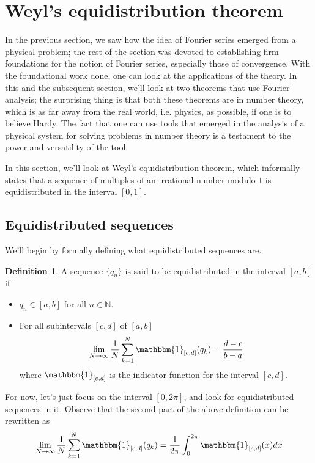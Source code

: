 \documentclass[12pt, titlepage]{article}
\theoremstyle{definition}
\newtheorem{defn}{Definition}[section]
\newcommand{\indi}[1]{\mathbbm{#1}}
\begin{document}
\section{Weyl's equidistribution theorem}
In the previous section, we saw how the idea of Fourier series emerged from a physical problem; the rest of the section was devoted to establishing firm foundations for the notion of Fourier series, especially those of convergence. With the foundational work done, one can look at the applications of the theory. In this and the subsequent section, we'll look at two theorems that use Fourier analysis; the surprising thing is that both these theorems are in number theory, which is as far away from the real world, i.e. physics, as possible, if one is to believe Hardy. The fact that one can use tools that emerged in the analysis of a physical system for solving problems in number theory is a testament to the power and versatility of the tool.

In this section, we'll look at Weyl's equidistribution theorem, which informally states that a sequence of multiples of an irrational number modulo $1$ is equidistributed in the interval $[0,1]$.

\subsection{Equidistributed sequences}
We'll begin by formally defining what equidistributed sequences are.
\begin{defn}
    A sequence $\{q_n\}$ is said to be equidistributed in the interval $[a,b]$ if
    \begin{itemize}
        \item $q_n \in [a,b]$ for all $n \in \mathbb{N}$.
        \item For all subintervals $[c,d]$ of $[a,b]$
                \begin{align*}
                    \lim_{N \to \infty} \frac{1}{N} \sum_{k=1}^{N} \indi{1}_{[c,d]}(q_k) = \frac{d-c}{b-a}
                \end{align*}
                where $\indi{1}_{[c,d]}$ is the indicator function for the interval $[c,d]$.
    \end{itemize}
\end{defn}
For now, let's just focus on the interval $[0,2\pi]$, and look for equidistributed sequences in it. Observe that the second part of the above definition can be rewritten as
\begin{align}
    \lim\limits_{N \to \infty} \frac{1}{N} \sum_{k=1}^{N} \indi{1}_{[c,d]}(q_k) = \frac{1}{2\pi} \int_{0}^{2\pi} \indi{1}_{[c,d]}(x) dx \label{eq:6}
\end{align}
\end{document}
